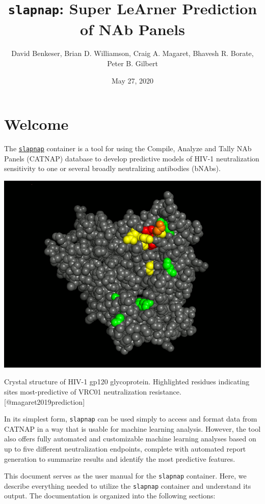 \documentclass[]{article}
\title{\texttt{slapnap}: Super LeArner Prediction of NAb Panels}
\author{David Benkeser, Brian D. Williamson, Craig A. Magaret, Bhavesh R.
Borate, Peter B. Gilbert}
\date{May 27, 2020}
\begin{document}
\maketitle

{
\setcounter{tocdepth}{2}
\tableofcontents
}
\section*{Welcome}\label{welcome}

The \href{https://hub.docker.com/r/slapnap/slapnap}{\texttt{slapnap}}
container is a tool for using the Compile, Analyze and Tally NAb Panels
(CATNAP) database to develop predictive models of HIV-1 neutralization
sensitivity to one or several broadly neutralizing antibodies (bNAbs).

\begin{center}\includegraphics[width=0.7\linewidth]{gp120} \end{center}\begin{center}
Crystal structure of HIV-1 gp120 glycoprotein. Highlighted residues
indicating sites most-predictive of VRC01 neutralization resistance.
{[}@magaret2019prediction{]}
\end{center}

In its simplest form, \texttt{slapnap} can be used simply to access and
format data from CATNAP in a way that is usable for machine learning
analysis. However, the tool also offers fully automated and customizable
machine learning analyses based on up to five different neutralization
endpoints, complete with automated report generation to summarize
results and identify the most predictive features.

This document serves as the user manual for the \texttt{slapnap}
container. Here, we describe everything needed to utilize the
\texttt{slapnap} container and understand its output. The documentation
is organized into the following sections:
\end{document}
